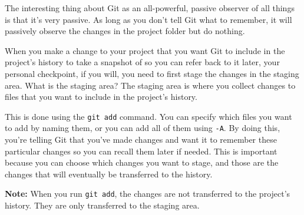 \documentclass[
  letterpaper,
  DIV=11,
  numbers=noendperiod]{scrreprt}
\begin{document}
The interesting thing about Git as an all-powerful, passive observer of
all things is that it's very passive. As long as you don't tell Git what
to remember, it will passively observe the changes in the project folder
but do nothing.

When you make a change to your project that you want Git to include in
the project's history to take a snapshot of so you can refer back to it
later, your personal checkpoint, if you will, you need to first stage
the changes in the staging area. What is the staging area? The staging
area is where you collect changes to files that you want to include in
the project's history.

This is done using the \texttt{git\ add} command. You can specify which
files you want to add by naming them, or you can add all of them using
\texttt{-A}. By doing this, you're telling Git that you've made changes
and want it to remember these particular changes so you can recall them
later if needed. This is important because you can choose which changes
you want to stage, and those are the changes that will eventually be
transferred to the history.

\textbf{Note:} When you run \texttt{git\ add}, the changes are not
transferred to the project's history. They are only transferred to the
staging area.
\end{document}
